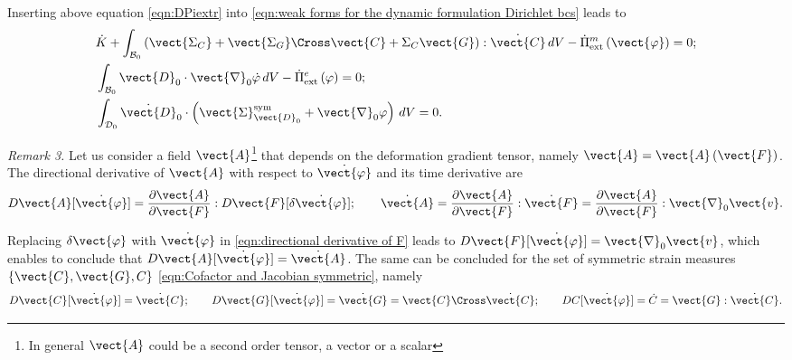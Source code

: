 Inserting above equation \eqref{eqn:DPiextr} into \eqref{eqn:weak forms for the dynamic formulation Dirichlet bcs} leads to
%
\begin{equation}\label{eqn:Wvarphi conservation of energy}
\begin{aligned}
&\dot{K} + \int_{\mathcal{B}_0}\left(\vect{\Sigma_C} + \vect{\Sigma_G}\Cross\vect{C} + \Sigma_C\vect{G}\right):\dot{\vect{C}}\,dV-  \dot{\Pi}^m_{\text{ext}}\left(\vect{\varphi}\right) = 0;\\
%
& \int_{\mathcal{B}_0}\vect{D}_0\cdot\vect{\nabla}_0\dot{\varphi}\,dV - \dot{\Pi}^e_{\text{ext}}\left(\varphi\right) = 0;\\
%
&  \int_{\mathcal{D}_0}\dot{\vect{D}}_0\cdot\left(\vect{\Sigma}^{\text{sym}}_{\vect{D}_0} + \vect{\nabla}_0\varphi\right)\,dV = 0.
\end{aligned}
\end{equation}
%



\noindent\makebox[\linewidth]{\rule{\textwidth}{0.4pt}}

\noindent \textit{Remark 3.} Let us consider a field $\vect{A}$\footnote{ In general $\vect{A}$ could be a second order tensor, a vector or a scalar} that depends on the deformation gradient tensor, namely $\vect{A} = \vect{A}\left(\vect{F}\right)$. The directional derivative of $\vect{A}$ with respect to $\dot{\vect{\varphi}}$ and its time derivative are
%
\begin{equation}
D\vect{A}[\dot{\vect{\varphi}}] = \frac{\partial\vect{A}}{\partial\vect{F}}:D\vect{F}[\delta\dot{\vect{\varphi}}];\qquad
\dot{\vect{A}} = \frac{\partial\vect{A}}{\partial\vect{F}}:\dot{\vect{F}} = \frac{\partial\vect{A}}{\partial\vect{F}}:\vect{\nabla}_0\vect{v}.
\end{equation}

Replacing $\delta\vect{\varphi}$ with $\dot{\vect{\varphi}}$ in \eqref{eqn:directional derivative of F} leads to
$D\vect{F}[\dot{\vect{\varphi}}] = \vect{\nabla}_0\vect{v}$, 
which enables to conclude that $D\vect{A}[\dot{\vect{\varphi}}] = \dot{\vect{A}}$. The same can be concluded for the set of symmetric strain measures $\{\vect{C},\vect{G},C\}$ \eqref{eqn:Cofactor and Jacobian symmetric}, namely
%
\begin{equation}\label{eqn:Cdot Gdot Cdot}
D\vect{C}[\dot{\vect{\varphi}}] = \dot{\vect{C}};\qquad
D\vect{G}[\dot{\vect{\varphi}}] = \dot{\vect{G}} = \vect{C}\Cross\dot{\vect{C}};\qquad
DC[\dot{\vect{\varphi}}] = \dot{C} = \vect{G}:\dot{\vect{C}}.
\end{equation}

